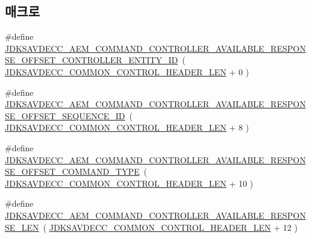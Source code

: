\subsection*{매크로}
\begin{DoxyCompactItemize}
\item 
\#define \hyperlink{group__command__controller__available__response_ga0c3babd64bf269e55a03799b747c5c69}{J\+D\+K\+S\+A\+V\+D\+E\+C\+C\+\_\+\+A\+E\+M\+\_\+\+C\+O\+M\+M\+A\+N\+D\+\_\+\+C\+O\+N\+T\+R\+O\+L\+L\+E\+R\+\_\+\+A\+V\+A\+I\+L\+A\+B\+L\+E\+\_\+\+R\+E\+S\+P\+O\+N\+S\+E\+\_\+\+O\+F\+F\+S\+E\+T\+\_\+\+C\+O\+N\+T\+R\+O\+L\+L\+E\+R\+\_\+\+E\+N\+T\+I\+T\+Y\+\_\+\+ID}~( \hyperlink{group__jdksavdecc__avtp__common__control__header_gaae84052886fb1bb42f3bc5f85b741dff}{J\+D\+K\+S\+A\+V\+D\+E\+C\+C\+\_\+\+C\+O\+M\+M\+O\+N\+\_\+\+C\+O\+N\+T\+R\+O\+L\+\_\+\+H\+E\+A\+D\+E\+R\+\_\+\+L\+EN} + 0 )
\item 
\#define \hyperlink{group__command__controller__available__response_ga3638f496627e5e20cf80d327fea6cbfb}{J\+D\+K\+S\+A\+V\+D\+E\+C\+C\+\_\+\+A\+E\+M\+\_\+\+C\+O\+M\+M\+A\+N\+D\+\_\+\+C\+O\+N\+T\+R\+O\+L\+L\+E\+R\+\_\+\+A\+V\+A\+I\+L\+A\+B\+L\+E\+\_\+\+R\+E\+S\+P\+O\+N\+S\+E\+\_\+\+O\+F\+F\+S\+E\+T\+\_\+\+S\+E\+Q\+U\+E\+N\+C\+E\+\_\+\+ID}~( \hyperlink{group__jdksavdecc__avtp__common__control__header_gaae84052886fb1bb42f3bc5f85b741dff}{J\+D\+K\+S\+A\+V\+D\+E\+C\+C\+\_\+\+C\+O\+M\+M\+O\+N\+\_\+\+C\+O\+N\+T\+R\+O\+L\+\_\+\+H\+E\+A\+D\+E\+R\+\_\+\+L\+EN} + 8 )
\item 
\#define \hyperlink{group__command__controller__available__response_ga3ee7371078dc411c09593cf72c2f0d17}{J\+D\+K\+S\+A\+V\+D\+E\+C\+C\+\_\+\+A\+E\+M\+\_\+\+C\+O\+M\+M\+A\+N\+D\+\_\+\+C\+O\+N\+T\+R\+O\+L\+L\+E\+R\+\_\+\+A\+V\+A\+I\+L\+A\+B\+L\+E\+\_\+\+R\+E\+S\+P\+O\+N\+S\+E\+\_\+\+O\+F\+F\+S\+E\+T\+\_\+\+C\+O\+M\+M\+A\+N\+D\+\_\+\+T\+Y\+PE}~( \hyperlink{group__jdksavdecc__avtp__common__control__header_gaae84052886fb1bb42f3bc5f85b741dff}{J\+D\+K\+S\+A\+V\+D\+E\+C\+C\+\_\+\+C\+O\+M\+M\+O\+N\+\_\+\+C\+O\+N\+T\+R\+O\+L\+\_\+\+H\+E\+A\+D\+E\+R\+\_\+\+L\+EN} + 10 )
\item 
\#define \hyperlink{group__command__controller__available__response_ga98b123879ee62947fd3e0daf599268fb}{J\+D\+K\+S\+A\+V\+D\+E\+C\+C\+\_\+\+A\+E\+M\+\_\+\+C\+O\+M\+M\+A\+N\+D\+\_\+\+C\+O\+N\+T\+R\+O\+L\+L\+E\+R\+\_\+\+A\+V\+A\+I\+L\+A\+B\+L\+E\+\_\+\+R\+E\+S\+P\+O\+N\+S\+E\+\_\+\+L\+EN}~( \hyperlink{group__jdksavdecc__avtp__common__control__header_gaae84052886fb1bb42f3bc5f85b741dff}{J\+D\+K\+S\+A\+V\+D\+E\+C\+C\+\_\+\+C\+O\+M\+M\+O\+N\+\_\+\+C\+O\+N\+T\+R\+O\+L\+\_\+\+H\+E\+A\+D\+E\+R\+\_\+\+L\+EN} + 12 )
\end{DoxyCompactItemize}

